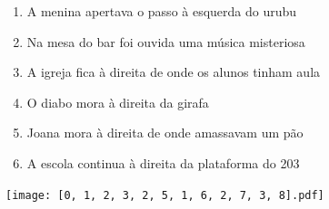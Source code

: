 \documentclass[12pt]{article}
\begin{document}
		 

\pagebreak


	\begin{enumerate}
		  \sffamily %
		  \large %


\vfill \item
A menina apertava o passo	%
à esquerda
do urubu	%

\vfill \item
Na mesa do bar	%
foi ouvida uma música misteriosa	%

\vfill \item
A igreja fica	%
à direita
de onde os alunos tinham aula	%

\vfill \item
O diabo mora	%
à direita
da girafa	%

\vfill \item
Joana mora	%
à direita
de onde amassavam um pão	%

\vfill \item
A escola continua	%
à direita
da plataforma do 203	%
	\end{enumerate}
		  
		  \hfill

		  \vfill

\texttt{[image: [0, 1, 2, 3, 2, 5, 1, 6, 2, 7, 3, 8].pdf]}


	\hfill	  	  


\pagebreak			
\end{document}
